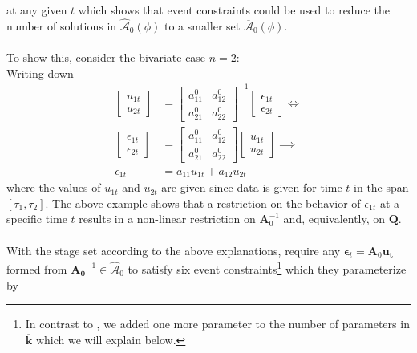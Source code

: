 \documentclass[a4paper,11pt,listof=nochaptergap,oneside,pointednumbers,bibtotoc,bigheadings,liststotoc,hidelinks]{scrbook}
\theoremstyle{mysatz}
\theoremstyle{mydefinition}
\theoremstyle{mytheorem}
\theoremstyle{mybemerkung}
\let\oldhat\hat
\newcommand{\vect}[1]{\boldsymbol{\mathbf{#1}}}
\newcommand{\hatt}[1]{\oldhat{\boldsymbol{\mathbf{#1}}}}
\begin{document}
at any given $t$ which shows that event constraints could be used to reduce the number of solutions in $\hatt{\mathcal{A}}_0(\phi)$ to a smaller set $\overline{\vect{\mathcal{A}}}_0(\phi)$. \\
\\
To show this, \citet{ludvigsonetal:18} consider the bivariate case $n=2$:\\
Writing down
\begin{equation} \label{eq:svar_ludvi11}
\begin{split}
	\begin{bmatrix}
    		u_{1t} \\
		u_{2t}
 		\end{bmatrix} & = 
		\begin{bmatrix}
    			a_{11}^0 &  a_{12}^0 \\
			a_{21}^0 &  a_{22}^0
 			\end{bmatrix}^{-1}
			\begin{bmatrix}
    				\epsilon_{1t} \\
				\epsilon_{2t}
 				\end{bmatrix}  \iff \\
	\begin{bmatrix}
    		\epsilon_{1t} \\
		\epsilon_{2t}
 		\end{bmatrix} & = 
		\begin{bmatrix}
    			a_{11}^0 &  a_{12}^0 \\
			a_{21}^0 &  a_{22}^0
 			\end{bmatrix}
			\begin{bmatrix}
    				u_{1t} \\
				u_{2t}
 				\end{bmatrix} \implies \\
				\epsilon_{1t} & = a_{11}u_{1t} + a_{12}u_{2t}
\end{split}								
\end{equation}
where the values of $u_{1t}$ and $u_{2t}$ are given since data is given for time $t$ in the span $[\tau_1, \tau_2]$. The above example shows that a restriction on the behavior of $\epsilon_{1t}$ at a specific time $t$ results in a non-linear restriction on $\vect{A}_0^{-1}$ and, equivalently, on $\vect{Q}$.
\\
\\
With the stage set according to the above explanations, \citet{ludvigsonetal:19} require any $\vect{\epsilon}_t = \vect{A}_0 \vect{u_t}$ formed from $\vect{A_0}^{-1} \in \hatt{\mathcal{A}}_0$ to satisfy six event constraints\footnote{In contrast to \citet{ludvigsonetal:19}, we added one more parameter to the number of parameters in $\overline{\vect{k}}$ which we will explain below.} which they parameterize by 
\end{document}
